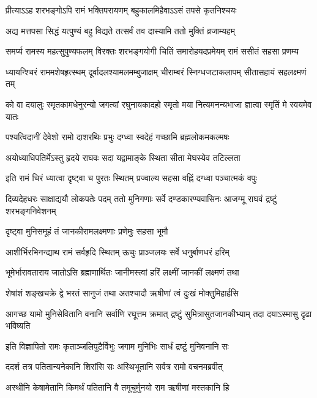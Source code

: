 \twolineshloka
{प्रीत्याऽऽह शरभङ्गोऽपि रामं भक्तिपरायणम्}
{बहुकालमिहैवाऽऽसं तपसे कृतनिश्चयः} %

\twolineshloka
{अद्य मत्तपसा सिद्धं यत्पुण्यं बहु विद्यते}
{तत्सर्वं तव दास्यामि ततो मुक्तिं व्रजाम्यहम्} %

\fourlineindentedshloka
{समर्प्य रामस्य महत्सुपुण्यफलम्}
{विरक्तः शरभङ्गयोगी}
{चितिं समारोहयदप्रमेयम्}
{रामं ससीतं सहसा प्रणम्य} %

\fourlineindentedshloka
{ध्यायन्श्चिरं राममशेषहृत्स्थम्}
{दूर्वादलश्यामलमम्बुजाक्षम्}
{चीराम्बरं स्निग्धजटाकलापम्}
{सीतासहायं सहलक्ष्मणं तम्} %

\fourlineindentedshloka
{को वा दयालुः स्मृतकामधेनुरन्यो}
{जगत्यां रघुनायकादहो}
{स्मृतो मया नित्यमनन्यभाजा}
{ज्ञात्वा स्मृतिं मे स्वयमेव यातः} %

\twolineshloka
{पश्यत्विदानीं देवेशो रामो दाशरथिः प्रभुः}
{दग्ध्वा स्वदेहं गच्छामि ब्रह्मलोकमकल्मषः} %

\twolineshloka
{अयोध्याधिपतिर्मेऽस्तु हृदये राघवः सदा}
{यद्वामाङ्के स्थिता सीता मेघस्येव तटिल्लता} %

\twolineshloka
{इति रामं चिरं ध्यात्वा दृष्ट्वा च पुरतः स्थितम्}
{प्रज्वाल्य सहसा वह्निं दग्ध्वा पञ्चात्मकं वपुः} %

\threelineshloka
{दिव्यदेहधरः साक्षाद्ययौ लोकपतेः पदम्}
{ततो मुनिगणाः सर्वे दण्डकारण्यवासिनः}
{आजग्मू राघवं द्रष्टुं शरभङ्गनिवेशनम्} %

\twolineshloka
{दृष्ट्वा मुनिसमूहं तं जानकीरामलक्ष्मणाः}
{प्रणेमुः सहसा भूमौ} %

\twolineshloka
{आशीर्भिरभिनन्द्याथ रामं सर्वहृदि स्थितम्}
{ऊचुः प्राञ्जलयः सर्वे धनुर्बाणधरं हरिम्} %

\twolineshloka
{भूमेर्भारावताराय जातोऽसि ब्रह्मणार्थितः}
{जानीमस्त्वां हरिं लक्ष्मीं जानकीं लक्ष्मणं तथा} %

\twolineshloka
{शेषांशं शङ्खचक्रे द्वे भरतं सानुजं तथा}
{अतश्चादौ ऋषीणां त्वं दुःखं मोक्तुमिहार्हसि} %

\fourlineindentedshloka
{आगच्छ यामो मुनिसेवितानि}
{वनानि सर्वाणि रघूत्तम क्रमात्}
{द्रष्टुं सुमित्रासुतजानकीभ्याम्}
{तदा दयाऽस्मासु दृढा भविष्यति} %

\twolineshloka
{इति विज्ञापितो रामः कृताञ्जलिपुटैर्विभुः}
{जगाम मुनिभिः सार्धं द्रष्टुं मुनिवनानि सः} %

\twolineshloka
{ददर्श तत्र पतितान्यनेकानि शिरांसि सः}
{अस्थिभूतानि सर्वत्र रामो वचनमब्रवीत्} %

\twolineshloka
{अस्थीनि केषामेतानि किमर्थं पतितानि वै}
{तमूचुर्मुनयो राम ऋषीणां मस्तकानि हि} %

